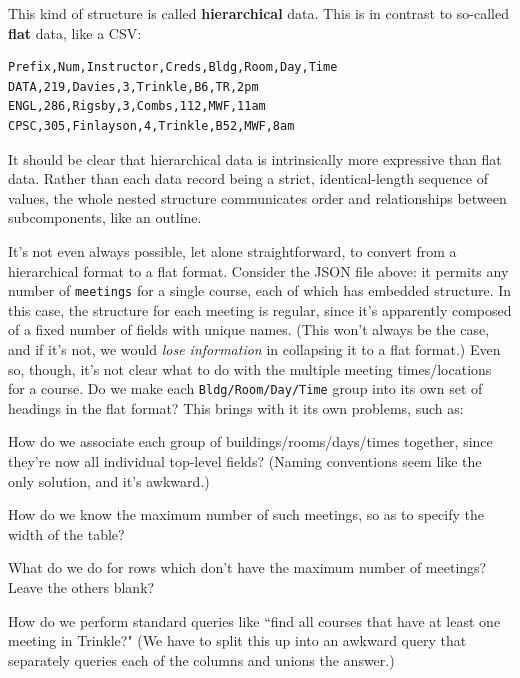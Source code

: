 \documentclass[12pt]{article}
\begin{document}
\normalsize

\pagebreak

This kind of structure is called \textbf{hierarchical} data. This is in
contrast to so-called \textbf{flat} data, like a CSV:

\begin{Verbatim}[fontsize=\small,samepage=true,frame=none]
Prefix,Num,Instructor,Creds,Bldg,Room,Day,Time
DATA,219,Davies,3,Trinkle,B6,TR,2pm
ENGL,286,Rigsby,3,Combs,112,MWF,11am
CPSC,305,Finlayson,4,Trinkle,B52,MWF,8am
\end{Verbatim}

It should be clear that hierarchical data is intrinsically more expressive
than flat data. Rather than each data record being a strict, identical-length
sequence of values, the whole nested structure communicates order and
relationships between subcomponents, like an outline.

It's not even always possible, let alone straightforward, to convert from a
hierarchical format to a flat format. Consider the JSON file above: it permits
any number of \texttt{meetings} for a single course, each of which has
embedded structure. In this case, the structure for each meeting is regular,
since it's apparently composed of a fixed number of fields with unique names.
(This won't always be the case, and if it's not, we would \textit{lose
information} in collapsing it to a flat format.) Even so, though, it's not
clear what to do with the multiple meeting times/locations for a course. Do we
make each \texttt{Bldg/Room/Day/Time} group into its own set of headings in
the flat format? This brings with it its own problems, such as:

\begin{compactenum}
\item How do we associate each group of buildings/rooms/days/times together,
since they're now all individual top-level fields? (Naming conventions seem
like the only solution, and it's awkward.)
\item How do we know the maximum number of such meetings, so as to specify the
width of the table?
\item What do we do for rows which don't have the maximum number of meetings?
Leave the others blank?
\item How do we perform standard queries like ``find all courses that have at
least one meeting in Trinkle?" (We have to split this up into an awkward query
that separately queries each of the columns and unions the answer.)
\end{compactenum}
\end{document}
